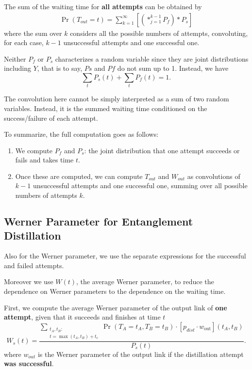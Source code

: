 \documentclass{masterthesis}
\begin{document}
The sum of the waiting time for \textbf{all attempts} can be obtained by
\begin{align}\label{eq:waiting_time_distillation}
    \Pr(T_{out} = t) = \sum_{k=1}^{\infty} \left[ \left( \ast_{j=1}^{k-1} P_f \right) \ast P_s \right]
\end{align}
where the sum over $k$ considers all the possible numbers of attempts, convoluting, for each case, $k-1$ unsuccessful attempts and one successful one.

Neither $P_f$ or $P_s$ characterizes a random variable since they are joint distributions including $Y$, that is to say, $Ps$ and $Pf$ do not sum up to 1. Instead, we have
\begin{equation}
    \sum_t P_s(t) + \sum_t P_f(t) = 1 .
\end{equation}

The convolution here cannot be simply interpreted as a sum of two random variables. Instead, it is the summed waiting time conditioned on the success/failure of each attempt.

To summarize, the full computation goes as follows:
\begin{enumerate}
    \item We compute $P_f$ and $P_s$: the joint distribution that one attempt succeeds or fails and takes time $t$.
    \item Once these are computed, we can compute $T_{out}$ and $W_{out}$ as convolutions of $k-1$ unsuccessful attempts and one successful one, summing over all possible numbers of attempts $k$.
\end{enumerate}

\subsection*{Werner Parameter for Entanglement Distillation}

Also for the Werner parameter, we use the separate expressions for the successful and failed attempts. 

Moreover we use $W(t)$, the average Werner parameter, to reduce the dependence on Werner parameters to the dependence on the waiting time.

First, we compute the average Werner parameter of the output link of \textbf{one attempt}, given that it succeeds and finishes at time $t$
\begin{equation}
    W_s(t) = \frac{\sum_{\substack{t_A, t_B : \\ t = \max(t_A, t_B) + t_c}} \Pr(T_A = t_A, T_B = t_B) \cdot [p_{dist} \cdot w_{\text{out}}](t_A, t_B)}{P_s(t)}.
\end{equation}
where $w_{out}$ is the Werner parameter of the output link if the distillation attempt \textbf{was successful}.
\end{document}
